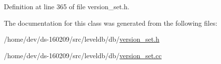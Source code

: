 Definition at line 365 of file version\+\_\+set.\+h.



The documentation for this class was generated from the following files\+:\begin{DoxyCompactItemize}
\item 
/home/dev/ds-\/160209/src/leveldb/db/\hyperlink{version__set_8h}{version\+\_\+set.\+h}\item 
/home/dev/ds-\/160209/src/leveldb/db/\hyperlink{version__set_8cc}{version\+\_\+set.\+cc}\end{DoxyCompactItemize}
